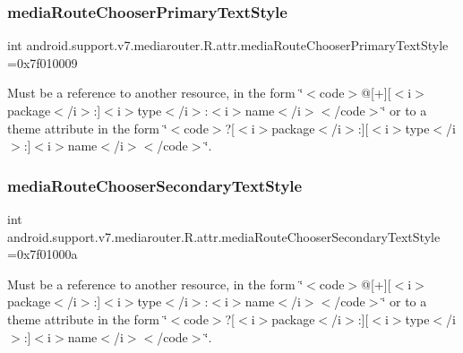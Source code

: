 \subsubsection{\texorpdfstring{media\+Route\+Chooser\+Primary\+Text\+Style}{mediaRouteChooserPrimaryTextStyle}}
{\footnotesize\ttfamily int android.\+support.\+v7.\+mediarouter.\+R.\+attr.\+media\+Route\+Chooser\+Primary\+Text\+Style =0x7f010009\hspace{0.3cm}{\ttfamily [static]}}

Must be a reference to another resource, in the form \char`\"{}$<$code$>$@\mbox{[}+\mbox{]}\mbox{[}$<$i$>$package$<$/i$>$\+:\mbox{]}$<$i$>$type$<$/i$>$\+:$<$i$>$name$<$/i$>$$<$/code$>$\char`\"{} or to a theme attribute in the form \char`\"{}$<$code$>$?\mbox{[}$<$i$>$package$<$/i$>$\+:\mbox{]}\mbox{[}$<$i$>$type$<$/i$>$\+:\mbox{]}$<$i$>$name$<$/i$>$$<$/code$>$\char`\"{}. \mbox{\label{classandroid_1_1support_1_1v7_1_1mediarouter_1_1R_1_1attr_aa03144d339e5025c283ee921787f6b96}} 
\subsubsection{\texorpdfstring{media\+Route\+Chooser\+Secondary\+Text\+Style}{mediaRouteChooserSecondaryTextStyle}}
{\footnotesize\ttfamily int android.\+support.\+v7.\+mediarouter.\+R.\+attr.\+media\+Route\+Chooser\+Secondary\+Text\+Style =0x7f01000a\hspace{0.3cm}{\ttfamily [static]}}

Must be a reference to another resource, in the form \char`\"{}$<$code$>$@\mbox{[}+\mbox{]}\mbox{[}$<$i$>$package$<$/i$>$\+:\mbox{]}$<$i$>$type$<$/i$>$\+:$<$i$>$name$<$/i$>$$<$/code$>$\char`\"{} or to a theme attribute in the form \char`\"{}$<$code$>$?\mbox{[}$<$i$>$package$<$/i$>$\+:\mbox{]}\mbox{[}$<$i$>$type$<$/i$>$\+:\mbox{]}$<$i$>$name$<$/i$>$$<$/code$>$\char`\"{}. \mbox{\label{classandroid_1_1support_1_1v7_1_1mediarouter_1_1R_1_1attr_a1fda60d3a9805d0fbb3af5cb00f1844e}} 
